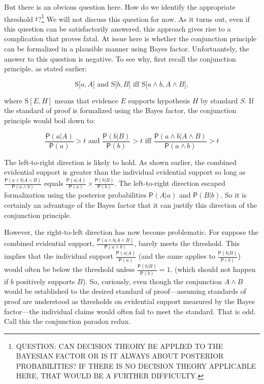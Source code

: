 \documentclass[10pt,dvipsnames,enabledeprecatedfontcommands]{scrartcl}
\newcommand{\et}{\wedge}
\newcommand{\pr}[1]{\mathsf{P}(#1)}
\begin{document}
But there is an obvious question here. How do we identify the
appropriate threshold
\(t\)?\footnote{QUESTION: CAN DECISION THEORY BE APPLIED TO THE BAYESIAN FACTOR OR IS IT ALWAYS ABOUT POSTERIOR PROBABILITIES? IF THERE IS NO DECISION THEORY APPLICABLE HERE, THAT WOULD BE A FURTHER DIFFICULTY.}
We will not discuss this question for now. As it turns out, even if this
question can be satisfactorily answered, this approach gives rise to a
complication that proves fatal. At issue here is whether the conjunction
principle can be formalized in a plausible manner using Bayes factor.
Unfortuantely, the answer to this question is negative. To see why,
first recall the conjunction principle, as stated earlier:

\[\text{S[$a, A$] and S[$b, B$] iff S[$a \wedge b, A\wedge B$]},\]

\noindent where \(\text{S}[E, H]\) means that evidence \(E\) supports
hypothesis \(H\) by standard \(S\). If the standard of proof is
formalized using the Bayes factor, the conjunction principle would boil
down to:

\[  \text{ $\frac{\pr{a | A }}{\pr{a}}>t$ and $\frac{\pr{ b | B}}{\pr{b}}>t$ iff $\frac{\pr{a \et b | A \et B}}{\pr{a \et b}}>t$ } \]

\noindent The left-to-right direction is likely to hold. As shown
earlier, the combined evidential support is greater than the individual
evidential support so long as
\(\frac{\pr{a \et b | A \et B}}{\pr{a \et b}}\) equals
\(\frac{\pr{a |A}}{\pr{a}} \times \frac{\pr{b |B}}{\pr{b}}\). The
left-to-right direction escaped formalization using the posterior
probabilities \(\pr{A | a}\) and \(\pr{B | b}\). So it is certainly an
advantage of the Bayes factor that it can justify this direction of the
conjunction principle.

However, the right-to-left direction has now become problematic. For
suppose the combined evidential support,
\(\frac{\pr{a \et b | A \et B}}{\pr{a \et b}}\), barely meets the
threshold. This implies that the individual support
\(\frac{\pr{a |A}}{\pr{a}}\) (and the same applies to
\(\frac{\pr{b |B}}{\pr{b}}\)) would often be below the threshold unless
\(\frac{\pr{b |B}}{\pr{b}}=1\).
(which should not happen if \(b\) positively supports \(B\)). So,
curiously, even though the conjunction \(A\et B\) would be established
to the desired standard of proof---assuming standards of proof are
understood as thresholds on evidential support measured by the Bayes
factor---the individual claims would often fail to meet the standard.
That is odd. Call this the conjunction paradox redux.
\end{document}
